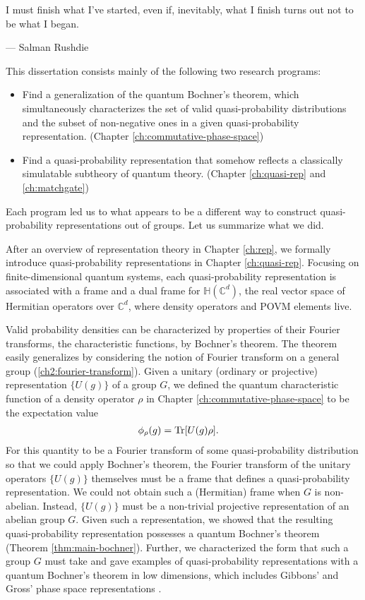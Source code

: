 \newcommand\rep{U}
\setlength\epigraphwidth{8.5cm}
\epigraph{I must finish what I've started, even if, inevitably, what I finish turns out not to be what I began.}{--- Salman Rushdie}

This dissertation consists mainly of the following two research programs:
\begin{itemize}
	\item Find a generalization of the quantum Bochner's theorem, which simultaneously characterizes the set of valid quasi-probability distributions and the subset of non-negative ones in a given quasi-probability representation. (Chapter \ref{ch:commutative-phase-space})
	\item Find a quasi-probability representation that somehow reflects a classically simulatable subtheory of quantum theory. (Chapter \ref{ch:quasi-rep} and \ref{ch:matchgate})
\end{itemize}
Each program led us to what appears to be a different way to construct quasi-prob\-abi\-li\-ty representations out of groups. Let us summarize what we did.

After an overview of representation theory in Chapter \ref{ch:rep}, we formally introduce quasi-probability representations in Chapter \ref{ch:quasi-rep}. Focusing on finite-dimensional quantum systems, each quasi-probability representation is associated with a frame and a dual frame for $\mathbb{H}(\mathbb{C}^d)$, the real vector space of Hermitian operators over $\mathbb{C}^d$, where density operators and POVM elements live.

Valid probability densities can be characterized by properties of their Fourier transforms, the characteristic functions, by Bochner's theorem. The theorem easily generalizes by considering the notion of Fourier transform on a general group (\autoref{ch2:fourier-transform}). Given a unitary (ordinary or projective) representation $\{\rep(g)\}$ of a group $G$, we defined the quantum characteristic function of a density operator $\rho$ in Chapter \ref{ch:commutative-phase-space} to be the expectation value
\begin{align}
\phi_\rho(g) &=  \Tr[\rep(g) \rho].
\end{align}
For this quantity to be a Fourier transform of some quasi-probability distribution so that we could apply Bochner's theorem, the Fourier transform of the unitary operators $\{\rep(g)\}$ themselves must be a frame that defines a quasi-probability representation. We could not obtain such a (Hermitian) frame when $G$ is non-abelian. Instead, $\{\rep(g)\}$ must be a non-trivial projective representation of an abelian group $G$. Given such a representation, we showed that the resulting quasi-probability representation possesses a quantum Bochner's theorem (Theorem \ref{thm:main-bochner}). Further, we characterized the form that such a group $G$ must take and gave examples of quasi-probability representations with a quantum Bochner's theorem in low dimensions, which includes Gibbons' \cite{gibbons_discrete_2004} and Gross' phase space representations \cite{gross_hudsons_2006}.

